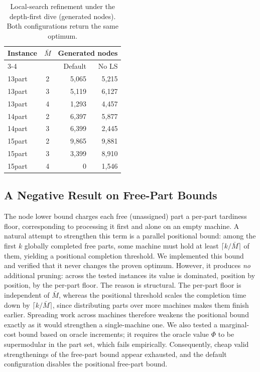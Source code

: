\documentclass[review,3p,times,authoryear]{elsarticle}
\begin{document}
\begin{table}[t]
	\centering
	\caption{Local-search refinement under the depth-first dive (generated nodes).
		Both configurations return the same optimum.}
	\label{tab:ls}
	\begin{tabular}{l c r r}
		\toprule
		\multirow{2}{*}{Instance} & \multirow{2}{*}{$\bar M$}
		& \multicolumn{2}{c}{Generated nodes} \\
		\cmidrule(lr){3-4}
		& & Default & No LS \\
		\midrule
		13part & 2 & 5{,}065 & 5{,}215 \\
		13part & 3 & 5{,}119 & 6{,}127 \\
		13part & 4 & 1{,}293 & 4{,}457 \\
		14part & 2 & 6{,}397 & 5{,}877 \\
		14part & 3 & 6{,}399 & 2{,}445 \\
		15part & 2 & 9{,}865 & 9{,}881 \\
		15part & 3 & 3{,}399 & 8{,}910 \\
		15part & 4 & 0       & 1{,}546 \\
		\bottomrule
	\end{tabular}
\end{table}

\subsection{A Negative Result on Free-Part Bounds}
\label{subsec:res_freepar}

The node lower bound charges each free (unassigned) part a per-part tardiness
floor, corresponding to processing it first and alone on an empty machine. A
natural attempt to strengthen this term is a parallel positional bound: among
the first $k$ globally completed free parts, some machine must hold at least
$\lceil k/\bar M\rceil$ of them, yielding a positional completion threshold. We
implemented this bound and verified that it never changes the proven optimum.
However, it produces \emph{no} additional pruning: across the tested instances
its value is dominated, position by position, by the per-part floor. The reason
is structural. The per-part floor is independent of $\bar M$, whereas the
positional threshold scales the completion time down by $\lceil k/\bar M\rceil$,
since distributing parts over more machines makes them finish earlier. Spreading
work across machines therefore weakens the positional bound exactly as it would
strengthen a single-machine one. We also tested a marginal-cost bound based on
oracle increments; it requires the oracle value $\Phi$ to be supermodular in the
part set, which fails empirically. Consequently, cheap valid strengthenings of
the free-part bound appear exhausted, and the default configuration disables the
positional free-part bound.
\end{document}

